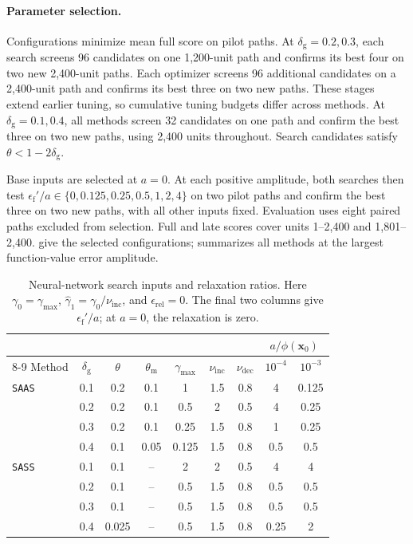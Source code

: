 \documentclass{article}
\begin{document}
\paragraph{Parameter selection.}
Configurations minimize mean full score on pilot paths. At
\(\delta_{\mathrm g}=0.2,0.3\), each search screens 96 candidates on
one 1,200-unit path and confirms its best four on two new 2,400-unit
paths. Each optimizer screens 96 additional candidates on a
2,400-unit path and confirms its best three on two new paths.
These stages extend earlier tuning, so cumulative tuning budgets
differ across methods. At \(\delta_{\mathrm g}=0.1,0.4\), all methods
screen 32 candidates on one path and confirm the best three on two
new paths, using 2,400 units throughout. Search candidates satisfy
\(\theta<1-2\delta_{\mathrm g}\).

Base inputs are selected at \(a=0\). At each positive amplitude, both
searches then test \(\epsilon_{\mathrm f}'/a\in
\{0,0.125,0.25,0.5,1,2,4\}\) on two pilot paths and confirm the best
three on two new paths, with all other inputs fixed. Evaluation uses
eight paired paths excluded from selection. Full and late scores
cover units 1--2,400 and 1,801--2,400.
 give the
selected configurations;  summarizes
all methods at the largest function-value error amplitude.

\begin{table}[H]
\centering
\caption{Neural-network search inputs and relaxation ratios.
Here \(\gamma_0=\gamma_{\max}\),
\(\hat\gamma_1=\gamma_0/\nu_{\mathrm{inc}}\), and
\(\epsilon_{\mathrm{rel}}=0\). The final two columns give
\(\epsilon_{\mathrm f}'/a\); at \(a=0\), the relaxation is zero.}
\label{tab:exp_nn_search_inputs}

\small
\setlength{\tabcolsep}{4pt}
\begin{tabular*}{\linewidth}{@{\extracolsep{\fill}}lcccccccc@{}}
\toprule
& & & & & & & \multicolumn{2}{c}{\(a/\phi(\bm x_0)\)}\\
\cmidrule(l){8-9}
Method & \(\delta_{\mathrm g}\) & \(\theta\) & \(\theta_{\mathrm m}\) & \(\gamma_{\max}\)
& \(\nu_{\mathrm{inc}}\) & \(\nu_{\mathrm{dec}}\) & \(10^{-4}\) & \(10^{-3}\)\\
\midrule
\texttt{SAAS} & 0.1 & 0.2 & 0.1 & 1 & 1.5 & 0.8 & 4 & 0.125\\
 & 0.2 & 0.2 & 0.1 & 0.5 & 2 & 0.5 & 4 & 0.25\\
 & 0.3 & 0.2 & 0.1 & 0.25 & 1.5 & 0.8 & 1 & 0.25\\
 & 0.4 & 0.1 & 0.05 & 0.125 & 1.5 & 0.8 & 0.5 & 0.5\\
\addlinespace[2pt]
\texttt{SASS} & 0.1 & 0.1 & -- & 2 & 2 & 0.5 & 4 & 4\\
 & 0.2 & 0.1 & -- & 0.5 & 1.5 & 0.8 & 0.5 & 0.5\\
 & 0.3 & 0.1 & -- & 0.5 & 1.5 & 0.8 & 0.5 & 0.5\\
 & 0.4 & 0.025 & -- & 0.5 & 1.5 & 0.8 & 0.25 & 2\\
\bottomrule
\end{tabular*}
\end{table}
\end{document}
